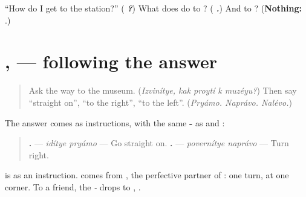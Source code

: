 \begin{tcolorbox}[breakable,colback=teal!4,colframe=teal!35!black,title={Before you move on}]
\textquotedblleft{}How do I get to the station?\textquotedblright{} (\emph{\textbf{   ?}}) What does \emph{} do to \emph{}? (\emph{\textbf{ .}}) And to \emph{}? (\textbf{Nothing:} \emph{\textbf{ }}.)
\end{tcolorbox}
\section[\texorpdfstring{\ru{идите} \ru{прямо} … (idítye pryámo …)}{идите прямо … (idítye pryámo …)}]{ ,   — following the answer}

\label{lesson:RU-C265-idite-pryamo}



\begin{quote}
Ask the way to the museum. (\emph{Izvinítye, kak proytí k muzéyu?}) Then say \textquotedblleft{}straight on\textquotedblright{}, \textquotedblleft{}to the right\textquotedblright{}, \textquotedblleft{}to the left\textquotedblright{}. (\emph{Pryámo. Naprávo. Nalévo.})
\end{quote}

\begin{grammarlens}[title={Grammar Lens: \ru{идите} and \ru{поверните}}]
The answer comes as instructions, with the same \textbf{-} as \emph{} and \emph{}:

\begin{quote}
\textbf{ .} — \emph{idítye pryámo} — Go straight on. \textbf{ .} — \emph{povernítye naprávo} — Turn right.
\end{quote}

\textbf{} is \emph{} as an instruction. \textbf{} comes from \emph{}, the perfective partner of \emph{}: one turn, at one corner. To a friend, the \emph{-} drops to \textbf{}, \textbf{}.
\end{grammarlens}

